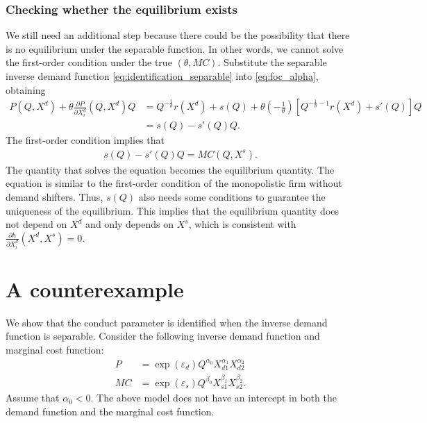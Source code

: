 \documentclass[11pt, a4paper]{article}
\theoremstyle{remark}
\begin{document}
\subsubsection{Checking whether the equilibrium exists}
We still need an additional step because there could be the possibility that there is no equilibrium under the separable function.
In other words, we cannot solve the first-order condition under the true $(\theta, MC)$.
Substitute the separable inverse demand function \eqref{eq:identification_separable} into \eqref{eq:foc_alpha}, obtaining
\begin{align}
    P(Q, X^{d}) + \theta \frac{\partial P}{\partial X_i^{d}} (Q, X^{d}) Q & =  Q^{-\frac{1}{\theta}} r(X^{d}) + s(Q) + \theta \left(-\frac{1}{\theta}\right) \left[  Q^{-\frac{1}{\theta} -1} r(X^{d}) + s'(Q)\right]Q\\
    & = s(Q) - s'(Q)Q.
\end{align}
The first-order condition implies that
\begin{align}
    s(Q) - s'(Q)Q = MC(Q, X^{s}).
\end{align}
The quantity that solves the equation becomes the equilibrium quantity.
The equation is similar to the first-order condition of the monopolistic firm without demand shifters.
Thus, $s(Q)$ also needs some conditions to guarantee the uniqueness of the equilibrium.
This implies that the equilibrium quantity does not depend on $X^{d}$ and only depends on $X^{s}$, which is consistent with $\frac{\partial h}{\partial X^{d}_{i}}(X^{d}, X^{s}) = 0$.










\section{A counterexample}

We show that the conduct parameter is identified when the inverse demand function is separable. 
Consider the following inverse demand function and marginal cost function:
\begin{align}
    P & = \exp(\varepsilon_{d}) Q^{\alpha_0} X_{d1}^{\alpha_1}X_{d2}^{\alpha_2}\label{eq:counter_demand}\\
    MC & = \exp(\varepsilon_{s})Q^{\beta_0} X_{s1}^{\beta_1} X_{s2}^{\beta_2}.\label{eq:counter_mc}
\end{align}
Assume that $\alpha_0 <0$.
The above model does not have an intercept in both the demand function and the marginal cost function. 
\end{document}
